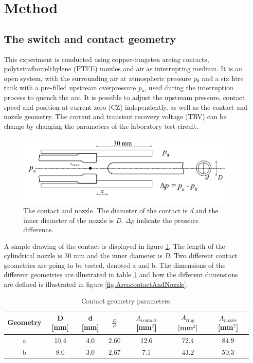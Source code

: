 \documentclass[10pt,a4paper,twoside]{article}
\begin{document}
\cleardoublepage

\section{Method} \label{sec:Method}

\subsection{The switch and contact geometry} \label{sec:switchAndContactGeo}
This experiment is conducted using copper-tungsten arcing contacts, polytetraflourelthylene (PTFE) nozzles and air as interrupting medium. It is an open system, with the surrounding air at atmospheric pressure \textit{p$_0$} and a six litre tank with a pre-filled upstream overpressure \textit{p$_u$}, used during the interruption process to quench the arc. It is possible to adjust the upstream pressure, contact speed and position at current zero (CZ) independently, as well as the contact and nozzle geometry. The current and transient recovery voltage (TRV) can be change by changing the parameters of the laboratory test circuit.

\begin{figure} [h]
\centering
\includegraphics[scale=0.3]{Bilder/Method/contactSetUpVmax2.png}
\caption{The contact and nozzle. The diameter of the contact is \textit{d} and the inner diameter of the nozzle is \textit{D}. $\Delta p$ indicate the pressure difference.} \label{fig:contactAndNozzle}
\end{figure}


A simple drawing of the contact is displayed in figure \ref{fig:contactAndNozzle}. The length of the cylindrical nozzle is 30 mm and the inner diameter is \textit{D}. Two different contact geometries are going to be tested, denoted a and b. The dimensions of the different geometries are illustrated in table \ref{tab:contGeoPara} and how the different dimensions are defined is illustrated in figure \ref{fig:AreacontactAndNozzle}.

\begin{table}[H]
\center
\caption{Contact geometry parameters.}
 \begin{tabular}{|c|c|c|c|c|c|c|}
\hline 
Geometry & D [mm] & d [mm] & $\frac{D}{d}$ & $A_\mathrm{{contact}}$ [mm$^2$] & $A_\mathrm{{ring}}$ [mm$^2$] & $A_\mathrm{{nozzle}}$ [mm$^2$] \\ 
\hline 
a & 10.4 & 4.0 & 2.60 & 12.6 & 72.4 & 84.9 \\ 
\hline 
b & 8.0 & 3.0 & 2.67 & 7.1 & 43.2 & 50.3 \\ 
\hline 
\end{tabular} 
\label{tab:contGeoPara}
\end{table}
\end{document}

